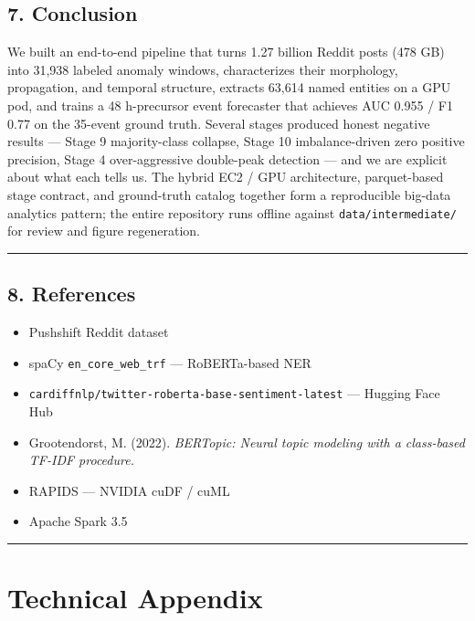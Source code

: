 \documentclass[
]{article}
\begin{document}
\subsection{7. Conclusion}\label{7-conclusion}

We built an end-to-end pipeline that turns 1.27 billion Reddit posts
(478 GB) into 31,938 labeled anomaly windows, characterizes their
morphology, propagation, and temporal structure, extracts 63,614 named
entities on a GPU pod, and trains a 48 h-precursor event forecaster that
achieves AUC 0.955 / F1 0.77 on the 35-event ground truth. Several
stages produced honest negative results --- Stage 9 majority-class
collapse, Stage 10 imbalance-driven zero positive precision, Stage 4
over-aggressive double-peak detection --- and we are explicit about what
each tells us. The hybrid EC2 / GPU architecture, parquet-based stage
contract, and ground-truth catalog together form a reproducible big-data
analytics pattern; the entire
repository runs offline against \texttt{data/intermediate/} for review
and figure regeneration.

\begin{center}\rule{0.5\linewidth}{0.5pt}\end{center}
\subsection{8. References}\label{8-references}

\begin{itemize}
\item
  Pushshift Reddit dataset
\item
  spaCy \texttt{en\_core\_web\_trf} --- RoBERTa-based NER
\item
  \texttt{cardiffnlp/twitter-roberta-base-sentiment-latest} --- Hugging
  Face Hub
\item
  Grootendorst, M. (2022). \emph{BERTopic: Neural topic modeling with a
  class-based TF-IDF procedure.}
\item
  RAPIDS --- NVIDIA cuDF / cuML
\item
  Apache Spark 3.5
\end{itemize}

\begin{center}\rule{0.5\linewidth}{0.5pt}\end{center}

\section{Technical Appendix}\label{technical-appendix}
\end{document}
